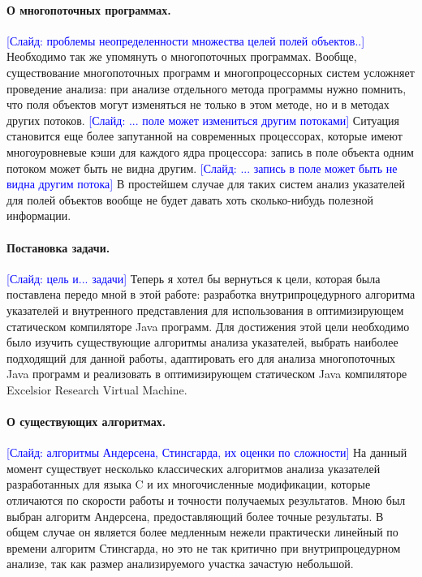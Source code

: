 \documentclass[12pt]{article}
\newcommand{\slide}[1]{\textcolor{Blue}{[Слайд: #1]}}
\newcommand{\eng}[1]{{\English#1}}
\begin{document}
  \paragraph{О многопоточных программах.}
  \slide{проблемы неопределенности множества целей полей объектов..}
  Необходимо так же упомянуть о многопоточных программах. Вообще,
  существование многопоточных программ и многопроцессорных систем усложняет
  проведение анализа: при анализе отдельного метода программы нужно помнить,
  что поля объектов могут изменяться не только в этом методе, но и в методах
  других потоков.
  \slide{... поле может измениться другим потоками}
  Ситуация становится еще более запутанной на современных процессорах, которые
  имеют многоуровневые кэши для каждого ядра процессора: запись в поле объекта
  одним потоком может быть не видна другим.
  \slide{... запись в поле может быть не видна другим потока}
  В простейшем случае для таких систем анализ указателей для полей объектов
  вообще не будет давать хоть сколько-нибудь полезной информации.

  \paragraph{Постановка задачи.}
  \slide{цель и... задачи}
  Теперь я хотел бы вернуться к цели, которая была поставлена передо мной в
  этой работе: разработка внутрипроцедурного алгоритма указателей и внутренного
  представления для использования в оптимизирующем статическом компиляторе Java
  программ. Для достижения этой цели необходимо было изучить существующие
  алгоритмы анализа указателей, выбрать наиболее подходящий для данной работы,
  адаптировать его для анализа многопоточных Java программ и реализовать в
  оптимизирующем статическом Java компиляторе \eng{Excelsior Research Virtual
  Machine}.

  \paragraph{О существующих алгоритмах.}
  \slide{алгоритмы Андерсена, Стинс\-гар\-да, их оценки по сложности}
  На данный момент существует несколько классических алгоритмов анализа
  указателей разработанных для языка C и их многочисленные модификации, которые
  отличаются по скорости работы и точности получаемых результатов. Мною был
  выбран алгоритм Андерсена, предоставляющий более точные результаты. В общем
  случае он является более медленным нежели практически линейный по времени
  алгоритм Стинсгарда, но это не так критично при внутрипроцедурном анализе,
  так как размер анализируемого участка зачастую небольшой.
\end{document}
